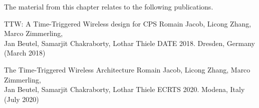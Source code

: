 \pagebreak
\begin{publi}

  The material from this chapter relates to the following publications.

  \inlineRef%
  {TTW: A Time-Triggered Wireless design for CPS}%
  {Romain Jacob, Licong Zhang, Marco Zimmerling, \\Jan Beutel, Samarjit Chakraborty, Lothar Thiele}%
  {DATE 2018. Dresden, Germany (March 2018)}

  \inlineRef%
  {The Time-Triggered Wireless Architecture}%
  {Romain Jacob, Licong Zhang, Marco Zimmerling, \\Jan Beutel, Samarjit Chakraborty, Lothar Thiele}%
  {ECRTS 2020. Modena, Italy (July 2020)}

\end{publi}
